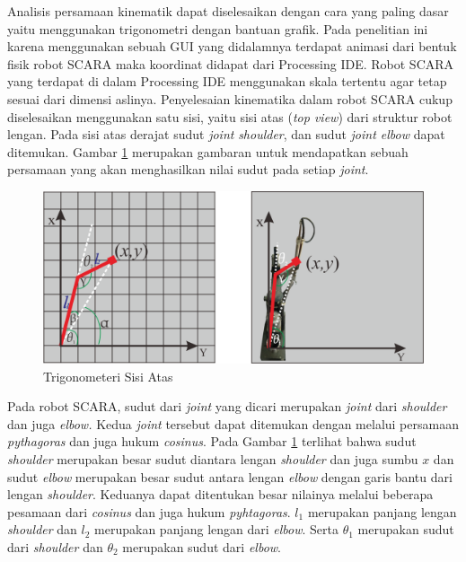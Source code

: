 Analisis persamaan kinematik dapat diselesaikan dengan cara yang paling dasar yaitu menggunakan trigonometri dengan bantuan grafik. Pada penelitian ini karena menggunakan sebuah GUI yang didalamnya terdapat animasi dari bentuk fisik robot SCARA maka koordinat didapat dari Processing IDE. Robot SCARA yang terdapat di dalam Processing IDE menggunakan skala tertentu agar tetap sesuai dari dimensi aslinya. Penyelesaian kinematika dalam robot SCARA cukup diselesaikan menggunakan satu sisi, yaitu sisi atas (\textit{top view}) dari struktur robot lengan. Pada sisi atas derajat sudut \textit{joint} \textit{shoulder}, dan sudut \textit{joint elbow} dapat ditemukan. Gambar \ref{pic.perskinematikabalik} merupakan gambaran untuk mendapatkan sebuah persamaan yang akan menghasilkan nilai sudut pada setiap \textit{joint\cite{koker}}.
\begin{figure}[H]
	\centering
	\includegraphics[width=12cm]{gambar/scara_atas.png}
	\caption{Trigonometeri Sisi Atas}
	\label{pic.perskinematikabalik}
\end{figure}
 
 
Pada robot SCARA, sudut dari \textit{joint} yang dicari merupakan \textit{joint} dari \textit{shoulder} dan juga \textit{elbow.} Kedua \textit{joint} tersebut dapat ditemukan dengan melalui persamaan \textit{pythagoras} dan juga hukum \textit{cosinus}. Pada Gambar \ref{pic.perskinematikabalik} terlihat bahwa sudut \textit{shoulder} merupakan besar sudut diantara lengan \textit{shoulder} dan juga sumbu $x$ dan sudut \textit{elbow} merupakan besar sudut antara lengan \textit{elbow} dengan garis bantu dari lengan \textit{shoulder}. Keduanya dapat ditentukan besar nilainya melalui beberapa pesamaan dari \textit{cosinus} dan juga hukum \textit{pyhtagoras}. $l_{1}$ merupakan panjang lengan \textit{shoulder} dan $l_{2}$ merupakan panjang lengan dari \textit{elbow}. Serta $\theta_{1}$ merupakan sudut dari \textit{shoulder} dan $\theta_{2}$ merupakan sudut dari \textit{elbow}\cite{victor}.  

